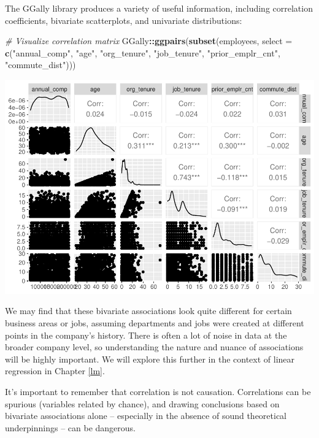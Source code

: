 \documentclass[]{book}
\newenvironment{Shaded}{\begin{snugshade}}{\end{snugshade}}
\newcommand{\CommentTok}[1]{\textcolor[rgb]{0.56,0.35,0.01}{\textit{#1}}}
\newcommand{\DataTypeTok}[1]{\textcolor[rgb]{0.13,0.29,0.53}{#1}}
\newcommand{\KeywordTok}[1]{\textcolor[rgb]{0.13,0.29,0.53}{\textbf{#1}}}
\newcommand{\NormalTok}[1]{#1}
\newcommand{\OperatorTok}[1]{\textcolor[rgb]{0.81,0.36,0.00}{\textbf{#1}}}
\newcommand{\StringTok}[1]{\textcolor[rgb]{0.31,0.60,0.02}{#1}}
\begin{document}
The GGally library produces a variety of useful information, including correlation coefficients, bivariate scatterplots, and univariate distributions:

\begin{Shaded}
\begin{Highlighting}[]
\CommentTok{# Visualize correlation matrix}
\NormalTok{GGally}\OperatorTok{::}\KeywordTok{ggpairs}\NormalTok{(}\KeywordTok{subset}\NormalTok{(employees, }\DataTypeTok{select =} \KeywordTok{c}\NormalTok{(}\StringTok{"annual_comp"}\NormalTok{, }\StringTok{"age"}\NormalTok{, }\StringTok{"org_tenure"}\NormalTok{, }\StringTok{"job_tenure"}\NormalTok{, }\StringTok{"prior_emplr_cnt"}\NormalTok{, }\StringTok{"commute_dist"}\NormalTok{)))}
\end{Highlighting}
\end{Shaded}

\includegraphics{People_Analytics_Lifecycle_files/figure-latex/unnamed-chunk-83-1.pdf}

We may find that these bivariate associations look quite different for certain business areas or jobs, assuming departments and jobs were created at different points in the company's history. There is often a lot of noise in data at the broader company level, so understanding the nature and nuance of associations will be highly important. We will explore this further in the context of linear regression in Chapter \ref{lm}.

It's important to remember that correlation is not causation. Correlations can be spurious (variables related by chance), and drawing conclusions based on bivariate associations alone -- especially in the absence of sound theoretical underpinnings -- can be dangerous.
\end{document}
